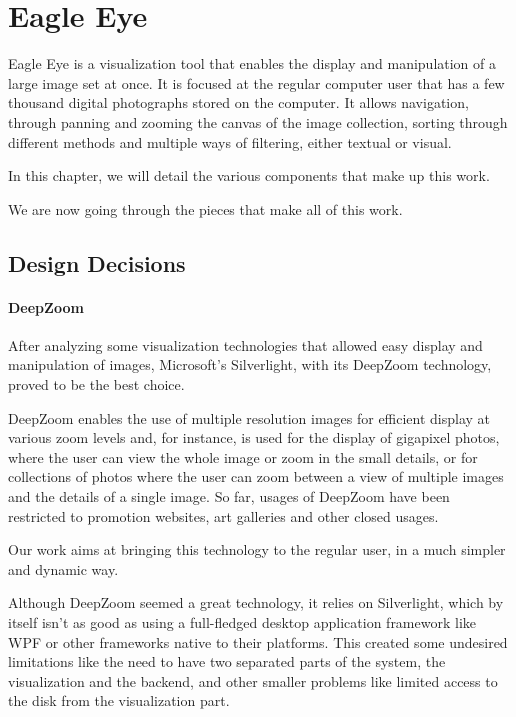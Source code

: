 \chapter{Eagle Eye}
\label{cha:eagle_eye}


Eagle Eye is a visualization tool that enables the display and manipulation of a large image set at once. It is focused at the regular computer user that has a few thousand digital photographs stored on the computer. It allows navigation, through panning and zooming the canvas of the image collection, sorting through different methods and multiple ways of filtering, either textual or visual.

In this chapter, we will detail the various components that make up this work. 

We are now going through the pieces that make all of this work.


\section{Design Decisions} %
\label{sub:design_decisions}

\subsubsection{DeepZoom} %
\label{ssub:deepzoom}

After analyzing some visualization technologies that allowed easy display and manipulation of images, Microsoft’s Silverlight, with its DeepZoom technology, proved to be the best choice.

DeepZoom enables the use of multiple resolution images for efficient display at various zoom levels and, for instance, is used for the display of gigapixel photos, where the user can view the whole image or zoom in the small details, or for collections of photos where the user can zoom between a view of multiple images and the details of a single image. So far, usages of DeepZoom have been restricted to promotion websites, art galleries and other closed usages.

Our work aims at bringing this technology to the regular user, in a much simpler and dynamic way.

Although DeepZoom seemed a great technology, it relies on Silverlight, which by itself isn't as good as using a full-fledged desktop application framework like \ac{WPF} or other frameworks native to their platforms. This created some undesired limitations like the need to have two separated parts of the system, the visualization and the backend, and other smaller problems like limited access to the disk from the visualization part.

